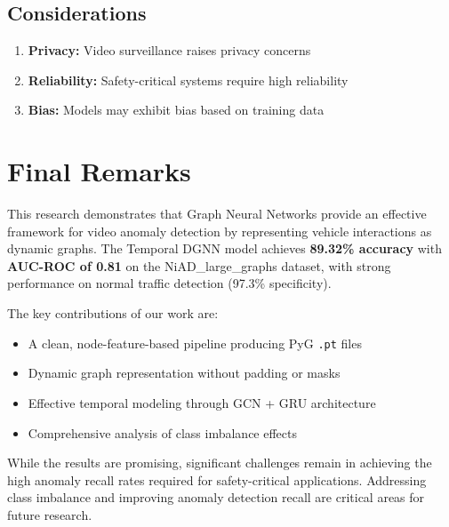 \subsection{Considerations}

\begin{enumerate}
    \item \textbf{Privacy:} Video surveillance raises privacy concerns
    \item \textbf{Reliability:} Safety-critical systems require high reliability
    \item \textbf{Bias:} Models may exhibit bias based on training data
\end{enumerate}

\section{Final Remarks}

This research demonstrates that Graph Neural Networks provide an effective framework for video anomaly detection by representing vehicle interactions as dynamic graphs. The Temporal DGNN model achieves \textbf{89.32\% accuracy} with \textbf{AUC-ROC of 0.81} on the NiAD\_large\_graphs dataset, with strong performance on normal traffic detection (97.3\% specificity).

The key contributions of our work are:
\begin{itemize}
    \item A clean, node-feature-based pipeline producing PyG \texttt{.pt} files
    \item Dynamic graph representation without padding or masks
    \item Effective temporal modeling through GCN + GRU architecture
    \item Comprehensive analysis of class imbalance effects
\end{itemize}

While the results are promising, significant challenges remain in achieving the high anomaly recall rates required for safety-critical applications. Addressing class imbalance and improving anomaly detection recall are critical areas for future research.

